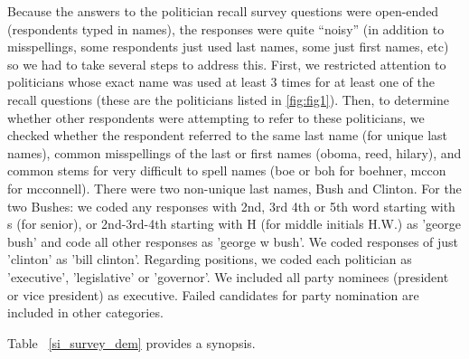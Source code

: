 \documentclass[12pt, letterpaper]{article}
\begin{document}
Because the answers to the politician recall survey questions were open-ended (respondents typed in names), the responses were quite ``noisy'' (in addition to misspellings, some respondents just used last names, some just first names, etc) so we had to take several steps to address this.  First, we restricted attention to politicians whose exact name was used at least 3 times for at least one of the recall questions (these are the politicians listed in \ref{fig:fig1}). Then, to determine whether other respondents were attempting to refer to these politicians, we checked whether the respondent referred to the same last name (for unique last names), common misspellings of the last or first names (oboma, reed, hilary), and common stems for very difficult to spell names (boe or boh for boehner, mccon for mcconnell).  There were two non-unique last names, Bush and Clinton.  For the two Bushes: we coded any responses with 2nd, 3rd 4th or 5th word starting with s (for senior), or 2nd-3rd-4th starting with H (for middle initials H.W.) as 'george bush' and code all other responses as 'george w bush'. We coded responses of just 'clinton' as 'bill clinton'.  Regarding positions, we coded each politician as 'executive', 'legislative' or 'governor'.  We included all party nominees (president or vice president) as executive.  Failed candidates for party nomination are included in other categories.

Table ~\ref{si_survey_dem} provides a synopsis.
\end{document}
